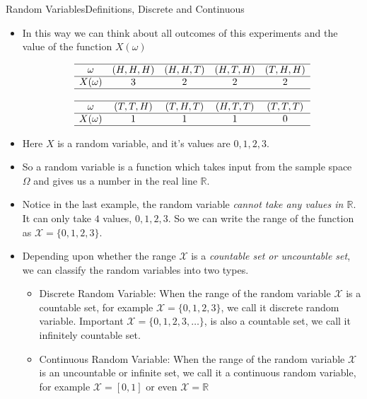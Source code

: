 \documentclass[8pt, usepdftitle=false]{beamer}
\begin{document}
\begin{frame}[allowframebreaks]{Random Variables}{Definitions, Discrete and Continuous}
\begin{itemize}
\framebreak

\item In this way we can think about all outcomes of this experiments and the value of the function $X(\omega)$


\begin{align*}
\begin{array}{ccccc}
\hline \omega &  {(H,H,H)} &  {(H,H,T)} &  {(H,T,H)} &  {(T,H,H)} \\
\hline X(\omega) & 3 & 2 & 2 & 2 \\
\hline \\
\hline \omega &    {(T,T,H)} &  {(T,H,T)} &  {(H,T,T)} &  {(T,T,T)} \\
\hline X(\omega)  & 1 & 1 & 1 & 0 \\
\hline
\end{array}
\end{align*}

\item \alert{Here $X$ is a random variable, and it's values are $0, 1, 2, 3$}. 

\item So a random variable is a function which takes input from the sample space $\Omega$ and gives us a number in the real line $\mathbb{R}$.


\framebreak

\item Notice in the last example, the random variable \emph{cannot take any values in $\mathbb{R}$}. It can only take $4$ values, $0, 1, 2, 3$.  So we can write the \alert{range of the function} as $\mathcal{X} = \{0, 1, 2, 3\}$.

\item Depending upon whether the range $\mathcal{X}$ is a \emph{countable set or uncountable set}, we can classify the random variables into two types. 

\medskip
\begin{itemize}
	\item \alert{Discrete Random Variable}: When the range of the random variable $\mathcal{X}$ is a countable set, for example $\mathcal{X} = \{0, 1, 2, 3\}$, we call it discrete random variable. Important $\mathcal{X} = \{0, 1, 2, 3, \ldots\}$, is also a countable set, we call it infinitely countable set.
	
	\medskip
	\item \alert{Continuous Random Variable}:  When the range of the random variable $\mathcal{X}$ is an uncountable or infinite set, we call it a continuous random variable, for example $\mathcal{X} = [0, 1]$ or even $\mathcal{X} = \mathbb{R}$
\end{itemize}
\medskip


\end{itemize}
\end{frame}
\end{document}
